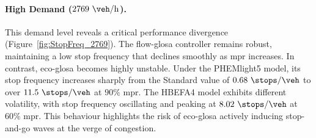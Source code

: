 \paragraph{High Demand ($2769~\unit{\veh\per\hour}$).}
This demand level reveals a critical performance divergence (Figure~\vref{fig:StopFreq_2769}). The \ac{flow-glosa} controller remains robust, maintaining a low stop frequency that declines smoothly as \ac{mpr} increases. In contrast, \ac{eco-glosa} becomes highly unstable. Under the PHEMlight5 model, its stop frequency increases sharply from the Standard value of $0.68~\unit{\stops\per\veh}$ to over $11.5~\unit{\stops\per\veh}$ at $90\%$ \ac{mpr}. The HBEFA4 model exhibits different volatility, with stop frequency oscillating and peaking at $8.02~\unit{\stops\per\veh}$ at $60\%$ \ac{mpr}. This behaviour highlights the risk of \ac{eco-glosa} actively inducing stop-and-go waves at the verge of congestion.

